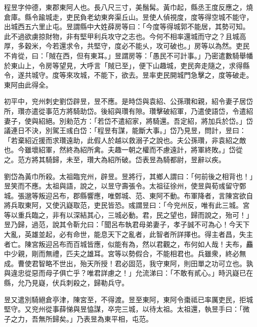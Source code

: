 \begin{pinyinscope}
 
 
 程昱字仲德，東郡東阿人也。長八尺三寸，美鬚髯。黃巾起，縣丞王度反應之，燒倉庫。縣令踰城走，吏民負老幼東奔渠丘山。昱使人偵視度，度等得空城不能守，出城西五六里止屯。昱謂縣中大姓薛房等曰：「今度等得城郭不能居，其勢可知。此不過欲虜掠財物，非有堅甲利兵攻守之志也。今何不相率還城而守之？且城高厚，多穀米，今若還求令，共堅守，度必不能乆，攻可破也。」房等以為然。吏民不肯從，曰：「賊在西，但有東耳。」昱謂房等：「愚民不可計事。」乃密遣數騎舉幡於東山上，令房等望見，大呼言「賊已至」，便下山趣城，吏民奔走隨之，求得縣令，遂共城守。度等來攻城，不能下，欲去。昱率吏民開城門急擊之，度等破走。東阿由此得全。
 
 
 
 
 初平中，兖州刺史劉岱辟昱，昱不應。是時岱與袁紹、公孫瓚和親，紹令妻子居岱所，瓚亦遣從事范方將騎助岱。後紹與瓚有隙。瓚擊破紹軍，乃遣使語岱，令遣紹妻子，使與紹絕。別勑范方：「若岱不遣紹家，將騎還。吾定紹，將加兵於岱。」岱議連日不決，別駕王彧白岱：「程昱有謀，能斷大事。」岱乃見昱，問計，昱曰：「若棄紹近援而求瓚遠助，此假人於越以救溺子之說也。夫公孫瓚，非袁紹之敵也。今雖壞紹軍，然終為紹所禽。夫趣一朝之權而不慮遠計，將軍終敗。」岱從之。范方將其騎歸，未至，瓚大為紹所破。岱表昱為騎都尉，昱辭以疾。
 
 
 
 
 劉岱為黃巾所殺。太祖臨兖州，辟昱。昱將行，其鄉人謂曰：「何前後之相背也！」昱笑而不應。太祖與語，說之，以昱守壽張令。太祖征徐州，使昱與荀彧留守鄄城。張邈等叛迎呂布，郡縣響應，唯鄄城、范、東阿不動。布軍降者，言陳宮欲自將兵取東阿，又使汎嶷取范，吏民皆恐。彧謂昱曰：「今兖州反，唯有此三城。宮等以重兵臨之，非有以深結其心，三城必動。君，民之望也，歸而說之，殆可！」昱乃歸，過范，說其令靳允曰：「聞呂布執君母弟妻子，孝子誠不可為心！今天下大亂，英雄並起，必有命世，能息天下之亂者，此智者所詳擇也。得主者昌，失主者亡。陳宮叛迎呂布而百城皆應，似能有為，然以君觀之，布何如人哉！夫布，麤中少親，剛而無禮，匹夫之雄耳。宮等以勢假合，不能相君也。兵雖衆，終必無成。曹使君智略不世出，殆天所授！君必固范，我守東阿，則田單之功可立也。孰與違忠從惡而母子俱亡乎？唯君詳慮之！」允流涕曰：「不敢有貳心。」時汎嶷已在縣，允乃見嶷，伏兵刺殺之，歸勒兵守。
 
 
 昱又遣別騎絕倉亭津，陳宮至，不得渡。昱至東阿，東阿令棗祗已率厲吏民，拒城堅守。又兖州從事薛悌與昱恊謀，卒完三城，以待太祖。太祖還，執昱手曰：「微子之力，吾無所歸矣。」乃表昱為東平相，屯范。
 

\end{pinyinscope}
